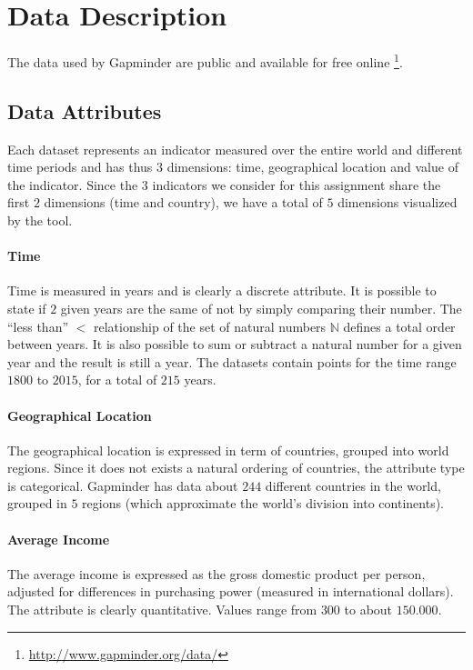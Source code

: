 \section{Data Description}
\label{sec:data}

The data used by Gapminder are public and available for free online \footnote{\url{http://www.gapminder.org/data/}}.

\subsection{Data Attributes}

Each dataset represents an indicator measured over the entire world and different time periods and has thus $3$ dimensions: time, geographical location and value of the indicator. Since the $3$ indicators we consider for this assignment share the first $2$ dimensions (time and country), we have a total of $5$ dimensions visualized by the tool.

\paragraph{Time}
Time is measured in years and is clearly a discrete attribute.
It is possible to state if $2$ given years are the same of not by simply comparing their number.
The ``less than'' $<$ relationship of the set of natural numbers $\mathbb{N}$ defines a total order between years.
It is also possible to sum or subtract a natural number for a given year and the result is still a year.
The datasets contain points for the time range $1800$ to $2015$, for a total of $215$ years.

\paragraph{Geographical Location}
The geographical location is expressed in term of countries, grouped into world regions.
Since it does not exists a natural ordering of countries, the attribute type is categorical.
Gapminder has data about $244$ different countries in the world, grouped in $5$ regions (which approximate the world's division into continents).

\paragraph{Average Income}
The average income is expressed as the gross domestic product per person, adjusted for differences in purchasing power (measured in international dollars).
The attribute is clearly quantitative.
Values range from $300$ to about $150.000$.

